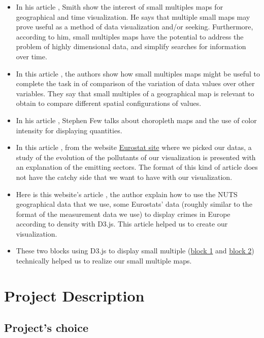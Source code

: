 \documentclass[preprint,journal]{vgtc}       %
\begin{document}
\begin{itemize}[leftmargin=*,parsep=0cm]
\item In his article \cite{Smith:2005:MSM}, Smith show the interest of small multiples maps for geographical and time visualization. He says that multiple small maps may prove useful as a method of data visualization and/or seeking. Furthermore, according to him, small multiples maps have the potential to address the problem of highly dimensional data, and simplify searches for information over time.


\item In this article \cite{Reimer:2011:SSM}, the authors show how small multiples maps might be useful to complete the task in of comparison of the variation of data values over other variables. They say that small multiples of a geographical map is relevant to obtain to compare different spatial configurations of values.

\item In his article \cite{Few:2009:GDV}, Stephen Few talks about choropleth maps and the use of color intensity for displaying quantities.

\item In this article \cite{Eurostats:2016:VMC}, from the website \href{http://ec.europa.eu/}{Eurostat site} where we picked our datas, a study of the evolution of the pollutants of our visualization is presented with an explanation of the emitting sectors. The format of this kind of article does not have the catchy side that we want to have with our visualization.


\item Here is this website's article \cite{Roger:2013:EWD}, the author explain how to use the NUTS geographical data that we use, some Eurostats' data (roughly similar to the format of the measurement data we use) to display crimes in Europe according to density with D3.js. This article helped us to create our visualization.

\item These two blocks using D3.js to display small multiple (\href{http://bl.ocks.org/tomgp/9386620}{block 1} and \href{https://bl.ocks.org/armollica/6314f45890bcaaa45c808b5d2b0c602f}{block 2}) technically helped us to realize our small multiple maps.

\end{itemize}


\section{Project Description}
	\subsection{Project's choice}
\end{document}
